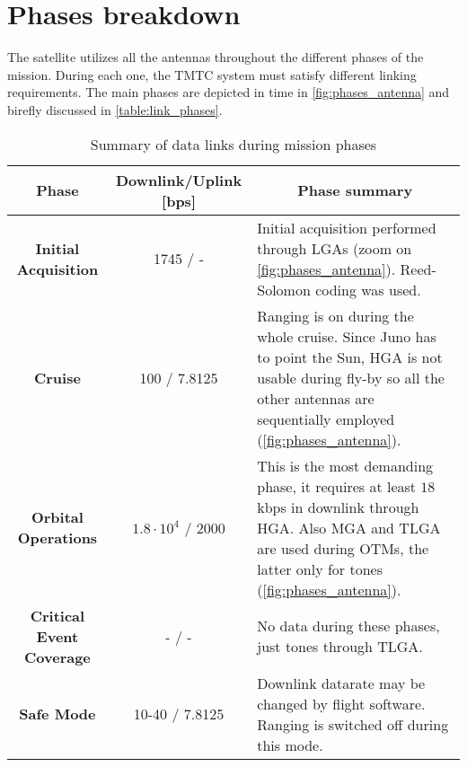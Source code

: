 \section{Phases breakdown}
\label{sec:phases_breakdown}

The satellite utilizes all the antennas throughout the different phases of the mission. During each one, the TMTC system must satisfy different linking requirements. The main phases are depicted in time in \autoref{fig:phases_antenna} and birefly discussed in \autoref{table:link_phases}. 
% 


\begin{table}[H]
    \renewcommand{\arraystretch}{1.7}
    \centering
    \begin{tabularx}{\linewidth}{|c|c|X|}
        \hline
        \textbf{Phase} & \textbf{Downlink/Uplink [bps]} &  \multicolumn{1}{|c|}{\textbf{Phase summary}}  \\
        \hline
        \hline
        \textbf{Initial Acquisition} & 1745 / - & 
        Initial acquisition performed through LGAs \newline (zoom on \autoref{fig:phases_antenna}). Reed-Solomon coding was used. \\ 
        \hline
        \textbf{Cruise} & 100 / 7.8125 & 
        Ranging is on during the whole cruise. Since Juno has to point the Sun, HGA is not usable during fly-by so all the other antennas are sequentially employed (\autoref{fig:phases_antenna}). \\
        \hline
        \textbf{Orbital Operations} & $1.8 \cdot 10^{4} $ / 2000 & 
        This is the most demanding phase, it requires at least $18$ kbps in downlink through HGA. Also MGA and TLGA are used during OTMs, the latter only for tones (\autoref{fig:phases_antenna}). \\
        \hline
        \textbf{Critical Event Coverage} & - / - & No data during these phases, just tones through TLGA.\\
        \hline
        \textbf{Safe Mode} & 10-40 / 7.8125 &
        Downlink datarate may be changed by flight software. Ranging is switched off during this mode. \\
        \hline
    \end{tabularx}
    \caption{Summary of data links during mission phases \cite{juno_telecommunication}}
    \label{table:link_phases}
\end{table}
